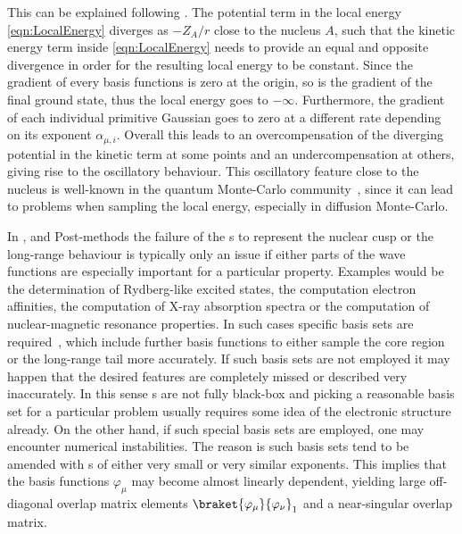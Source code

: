 This can be explained following \cite{Ma2005}.
The potential term in the local energy \eqref{eqn:LocalEnergy} diverges
as $-Z_A/r$ close to the nucleus $A$,
such that the kinetic energy term inside \eqref{eqn:LocalEnergy}
needs to provide an equal and opposite
divergence in order for the resulting local energy to be constant.
Since the gradient of every {\cGTO} basis functions is zero at the origin,
so is the gradient of the final \HF ground state,
thus the local energy goes to $-\infty$.
Furthermore, the gradient of each individual primitive Gaussian
goes to zero at a different rate
depending on its exponent $\alpha_{\mu,i}$.
Overall this leads to an overcompensation
of the diverging potential in the kinetic term at some points
and an undercompensation at others,
giving rise to the oscillatory behaviour.
This oscillatory feature close to the nucleus is well-known
in the quantum Monte-Carlo community~\cite{Foulkes2001,Ma2005},
since it can lead to problems when sampling the local energy,
especially in diffusion Monte-Carlo.

In \HF, \DFT and Post-\HF methods
the failure of the {\cGTO}s to represent the nuclear cusp
or the long-range behaviour is typically only an issue
if either parts of the wave functions are especially important
for a particular property.
Examples would be the determination of Rydberg-like excited states,
the computation electron affinities,
the computation of X-ray absorption spectra
or the computation of nuclear-magnetic resonance properties.
In such cases specific basis sets
are required~\cite{Hill2013,Jensen2013},
which include further \cGTO basis functions
to either sample the core region or the long-range tail more accurately.
If such basis sets are not employed
it may happen that the desired features are completely missed or described very inaccurately.
In this sense {\cGTO}s are not fully black-box and
picking a reasonable basis set for a particular problem
usually requires some idea of the electronic structure already.
On the other hand, if such special basis sets are employed,
one may encounter numerical instabilities.
The reason is such basis sets
tend to be amended with {\cGTO}s of either very small
or very similar exponents.
This implies that the basis functions $\varphi_\mu$ may
become almost linearly dependent,
yielding large off-diagonal
overlap matrix elements $\braket{\varphi_\mu}{\varphi_\nu}_1$
and a near-singular overlap matrix.

